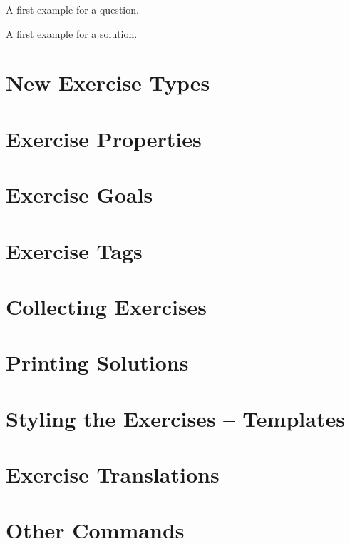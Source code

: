 \documentclass[load-preamble+]{cnltx-doc}
\begin{document}
\begin{example}
  \begin{question}
    A first example for a question.
  \end{question}
  \begin{solution}
    A first example for a solution.
  \end{solution}
\end{example}

\section{New Exercise Types}

\section{Exercise Properties}

\section{Exercise Goals}

\section{Exercise Tags}

\section{Collecting Exercises}

\section{Printing Solutions}

\section{Styling the Exercises -- Templates}

\section{Exercise Translations}

\section{Other Commands}

\end{document}
